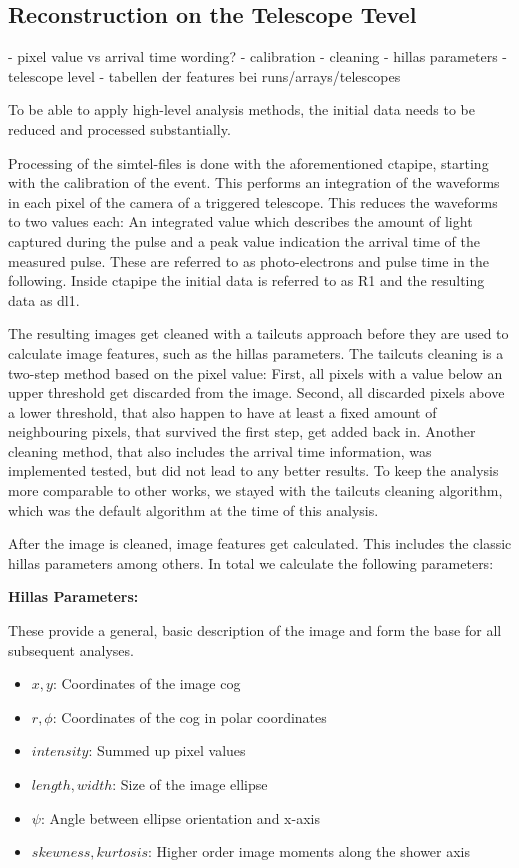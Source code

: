 \subsection{Reconstruction on the Telescope Tevel}
\label{sec:tel_analysis}

- pixel value vs arrival time wording?
- calibration
- cleaning
- hillas parameters 
- telescope level
- tabellen der features bei runs/arrays/telescopes

To be able to apply high-level analysis methods, the initial data 
needs to be reduced and processed substantially.

Processing of the simtel-files is done with the aforementioned ctapipe, starting with 
the calibration of the event. This performs an integration of the waveforms in 
each pixel of the camera of a triggered telescope. 
This reduces the waveforms to two values each: An integrated value which describes 
the amount of light captured during the pulse and a peak value indication the arrival 
time of the measured pulse. These are referred to as 
photo-electrons and pulse time in the following.
Inside ctapipe the initial data is referred to as R1
and the resulting data as dl1. 

The resulting images get cleaned with a tailcuts approach before they are
used to calculate image features, such as the hillas parameters.
The tailcuts cleaning is a two-step method based on the pixel value:
First, all pixels with a value below an upper threshold get discarded from 
the image. Second, all discarded pixels above a lower threshold, that also 
happen to have at least a fixed amount of neighbouring pixels,
that survived the first step, get added back in.
Another cleaning method, that also includes the arrival time information, 
was implemented tested, but did not lead to any better results.
To keep the analysis more comparable to other works, we stayed with 
the tailcuts cleaning algorithm, which was the default algorithm at the time 
of this analysis.

After the image is cleaned, image features get calculated.
This includes the classic hillas parameters among others.
In total we calculate the following parameters:

\textbf{Hillas Parameters:}

These provide a general, basic description of the image and form the base for 
all subsequent analyses.
\begin{itemize}
    \item{$x, y$: Coordinates of the image cog}
    \item{$r, \phi$: Coordinates of the cog in polar coordinates}
    \item{$intensity$: Summed up pixel values}
    \item{$length, width$: Size of the image ellipse}
    \item{$\psi$: Angle between ellipse orientation and x-axis}
    \item{$skewness, kurtosis$: Higher order image moments along the shower axis}
\end{itemize}

